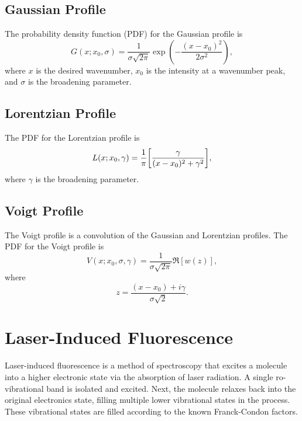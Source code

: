 \documentclass[11pt, twoside, fleqn]{report}
\DeclarePairedDelimiter\bk{\lbrack}{\rbrack}
\newcommand{\img}{i}
\begin{document}
\section{Gaussian Profile}
\label{s:gaussian_profile}

The probability density function (PDF) for the Gaussian profile is
\begin{equation*}
    G(x; x_0, \sigma) = \frac{1}{\sigma\sqrt{2\pi}}\exp(-\frac{(x - x_0)^2}{2\sigma^2}),
\end{equation*}
where $x$ is the desired wavenumber, $x_0$ is the intensity at a wavenumber peak, and $\sigma$ is the broadening parameter.

\section{Lorentzian Profile}
\label{s:lorentzian_profile}

The PDF for the Lorentzian profile is
\begin{equation*}
    L(x; x_0, \gamma) = \frac{1}{\pi}\bk*{\frac{\gamma}{(x - x_0)^2 + \gamma^2}},
\end{equation*}
where $\gamma$ is the broadening parameter.

\section{Voigt Profile}
\label{s:voigt_profile}

The Voigt profile is a convolution of the Gaussian and Lorentzian profiles. The PDF for the Voigt profile is
\begin{equation*}
    V(x; x_0, \sigma, \gamma) = \frac{1}{\sigma\sqrt{2\pi}}\Re[w(z)],
\end{equation*}
where
\begin{equation*}
    z = \frac{(x - x_0) + \img\gamma}{\sigma\sqrt{2}}.
\end{equation*}

\chapter{Laser-Induced Fluorescence}
\label{c:laser-induced_flourescence}

Laser-induced fluorescence is a method of spectroscopy that excites a molecule into a higher electronic state via the absorption of laser radiation. A single ro-vibrational band is isolated and excited. Next, the molecule relaxes back into the original electronics state, filling multiple lower vibrational states in the process. These vibrational states are filled according to the known Franck-Condon factors.
\end{document}
